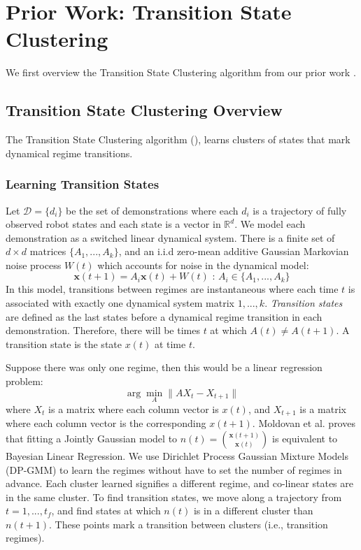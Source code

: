 \section{Prior Work: Transition State Clustering}

We first overview the Transition State Clustering algorithm from our prior work \cite{krishnan2015tsc}.

\subsection{Transition State Clustering Overview}
The Transition State Clustering algorithm (\sys), learns clusters of states that mark dynamical regime transitions.

\subsubsection{Learning Transition States}
Let $\mathcal{D}=\{d_i\}$ be the set of demonstrations where each $d_i$ is a trajectory of fully observed robot states and each state is a vector in $\mathbb{R}^d$.
We model each demonstration as a switched linear dynamical system.
There is a finite set of $d \times d$ matrices $\{A_1,...,A_k\}$, and an i.i.d zero-mean additive Gaussian Markovian noise process $W(t)$ which accounts for noise in the dynamical model:
\[
\mathbf{x}(t+1) = A_{i}\mathbf{x}(t) + W(t) \text{ : } A_i \in \{A_1,...,A_k\}
\]
In this model, transitions between regimes are instantaneous where each time $t$ is associated with exactly one dynamical system matrix $1,...,k$.
\emph{Transition states} are defined as the last states before a dynamical regime transition in each demonstration.
Therefore, there will be times $t$ at which $A(t) \ne A(t+1)$.
A transition state is the state $x(t)$ at time $t$.

Suppose there was only one regime, then this would be a linear regression problem:
\[
\arg\min_A \|A X_t - X_{t+1}\|
\]
where $X_t$ is a matrix where each column vector is $x(t)$, and $X_{t+1}$ is a matrix where each column vector is the corresponding $x(t+1)$.
Moldovan et al. \cite{moldovan2013dirichlet} proves that fitting a Jointly Gaussian model to $n(t) = \binom{\mathbf{x}(t+1)}{\mathbf{x}(t)}$ is equivalent to Bayesian Linear Regression.
We use Dirichlet Process Gaussian Mixture Models (DP-GMM) to learn the regimes without have to set the number of regimes in advance.
Each cluster learned signifies a different regime, and co-linear states are in the same cluster.
To find transition states, we move along a trajectory from $t=1,...,t_f$, and find states at which $n(t)$ is in a different cluster than $n(t+1)$.
These points mark a transition between clusters (i.e., transition regimes).

